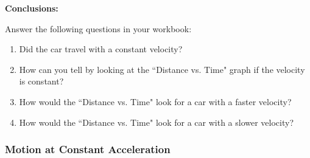     \par
  \par 
        
        \label{m38795*id71722}\noindent{}\textbf{Conclusions:}
          
Answer the following questions in your workbook:

        \label{m38795*id71746}\begin{enumerate}[noitemsep, label=\textbf{\arabic*}. ] 
            \label{m38795*uid108}\item Did the car travel with a constant velocity?
\label{m38795*uid109}\item How can you tell by looking at the ``Distance vs. Time" graph if the velocity is constant?
\label{m38795*uid110}\item How would the ``Distance vs. Time" look for a car with a faster velocity?
\label{m38795*uid111}\item How would the ``Distance vs. Time" look for a car with a slower velocity?
\end{enumerate}
        \par 
        

      
      \label{m38795*uid112}
            \subsubsection{ Motion at Constant Acceleration}
            \nopagebreak
            
